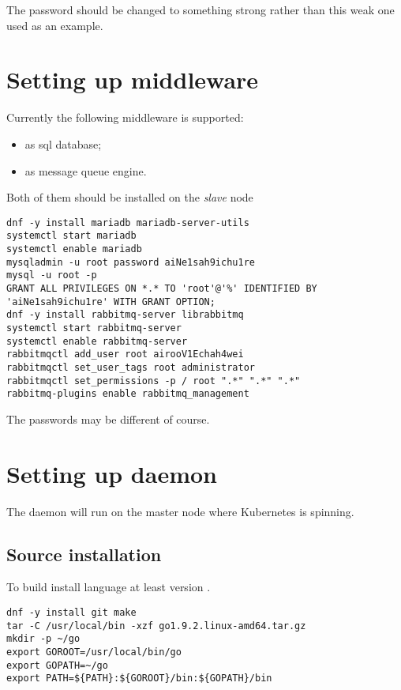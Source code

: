 The password should be changed to something strong rather than
this weak one used as an example.

\section{Setting up middleware}
\label{sec:setup-mware}

Currently the following middleware is supported:
\begin{itemize}
\item{ as sql database;}
\item{ as message queue engine.}
\end{itemize}

Both of them should be installed on the \emph{slave} node

\begin{lstlisting}
dnf -y install mariadb mariadb-server-utils
systemctl start mariadb
systemctl enable mariadb
mysqladmin -u root password aiNe1sah9ichu1re
mysql -u root -p
GRANT ALL PRIVILEGES ON *.* TO 'root'@'%' IDENTIFIED BY 'aiNe1sah9ichu1re' WITH GRANT OPTION;
dnf -y install rabbitmq-server librabbitmq
systemctl start rabbitmq-server
systemctl enable rabbitmq-server
rabbitmqctl add_user root airooV1Echah4wei
rabbitmqctl set_user_tags root administrator
rabbitmqctl set_permissions -p / root ".*" ".*" ".*"
rabbitmq-plugins enable rabbitmq_management
\end{lstlisting}

The passwords may be different of course.

\section{Setting up  daemon}
\label{sec:setup-swifty}

The  daemon will run on the master node
where Kubernetes is spinning.

\subsection{Source installation}
\label{subsec:setup-swifty-src}

To build  install 
language at least version
.

\begin{lstlisting}
dnf -y install git make
tar -C /usr/local/bin -xzf go1.9.2.linux-amd64.tar.gz
mkdir -p ~/go
export GOROOT=/usr/local/bin/go
export GOPATH=~/go
export PATH=${PATH}:${GOROOT}/bin:${GOPATH}/bin
\end{lstlisting}

